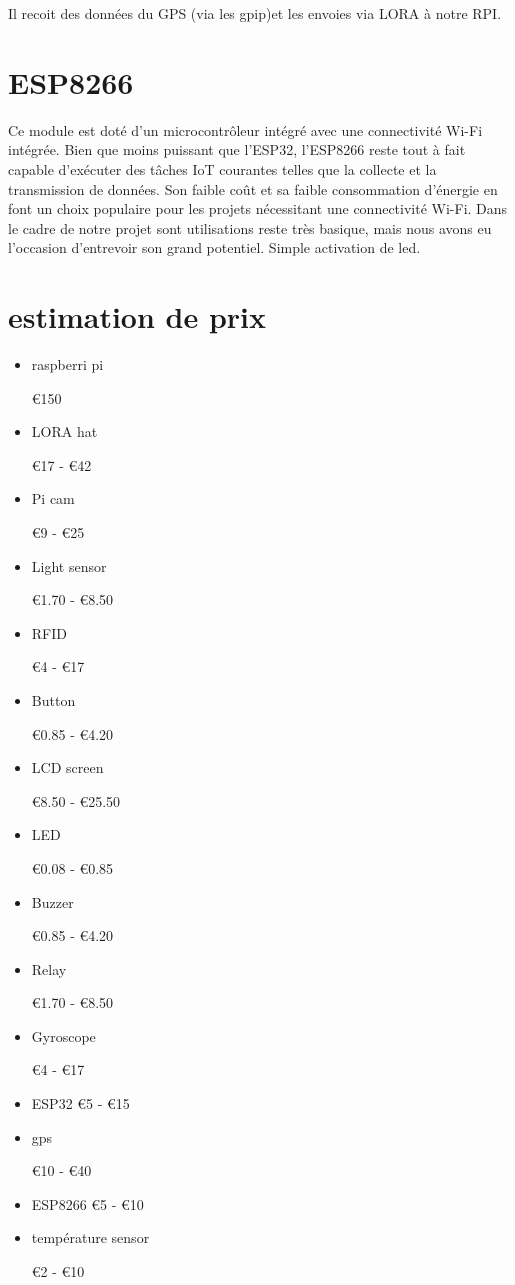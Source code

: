 Il recoit des données du GPS (via les gpip)et les envoies via LORA à notre RPI.
\section{ESP8266}
Ce module est doté d'un microcontrôleur intégré avec une connectivité Wi-Fi intégrée. Bien que moins puissant que l'ESP32, l'ESP8266 reste tout à fait capable d'exécuter des tâches IoT courantes telles que la collecte et la transmission de données. Son faible coût et sa faible consommation d'énergie en font un choix populaire pour les projets nécessitant une connectivité Wi-Fi.
Dans le cadre de notre projet sont utilisations reste très basique, mais nous avons eu l'occasion d'entrevoir son grand potentiel.  Simple activation de led.


\section{estimation de prix}

\begin{itemize}
	\item raspberri pi 
	
	€150
	\item LORA hat
	
	€17 - €42
	\item Pi cam
	
	€9 - €25
	\item Light sensor
	
	€1.70 - €8.50
	\item RFID
	
	€4 - €17
	\item Button
	
	€0.85 - €4.20
	\item LCD screen
	
	€8.50 - €25.50
	\item LED
	
	€0.08 - €0.85
	\item Buzzer
	
	€0.85 - €4.20
	\item Relay
	
	€1.70 - €8.50
	\item Gyroscope
	
	€4 - €17
	
	\item ESP32	
	€5 - €15
	
	\item gps
	
	€10 - €40
	
	\item ESP8266	
	€5 - €10
	
	\item température sensor	
 
	€2 - €10
\end{itemize}


